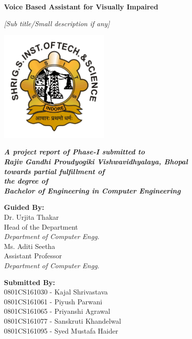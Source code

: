 \begin{titlepage}
    \centering
    \LARGE
    \textbf{Voice Based Assistant for Visually Impaired}
    
    \Large
    \textit{[Sub title/Small description if any]}
    
    \vspace*{0.7cm}
    
    \includegraphics[width=0.4\textwidth]{images/logo.png}
    
    \vspace*{0.7cm}
    
    \textit{\textbf{A project report of Phase-I submitted to\\
    Rajiv Gandhi Proudyogiki Vishwavidhyalaya, Bhopal \\
    towards partial fulfillment of \\
    the degree of \\ 
    Bachelor of Engineering in Computer Engineering}}
    
    
    \vspace*{\fill}
    \large
    \begin{minipage}[t]{0.45\textwidth}
    \flushleft
    \textbf{Guided By:\\}
    Dr. Urjita Thakar \\
    Head of the Department \\
    \emph{Department of Computer Engg.} \\
    \vspace*{0.5cm}
    Ms. Aditi Seetha \\
    Assistant Professor \\
    \emph{Department of Computer Engg.} \\
    \end{minipage}
    \hfill
    \begin{minipage}[t]{0.45\textwidth}

    \textbf{Submitted By: \\}
    0801CS161030 - Kajal Shrivastava \\
    0801CS161061 - Piyush Parwani \\
    0801CS161065 - Priyanshi Agrawal \\
    0801CS161077 - Sanskruti Khandelwal \\
    0801CS161095 - Syed Mustafa Haider \\
    

\end{minipage}
\end{titlepage}
